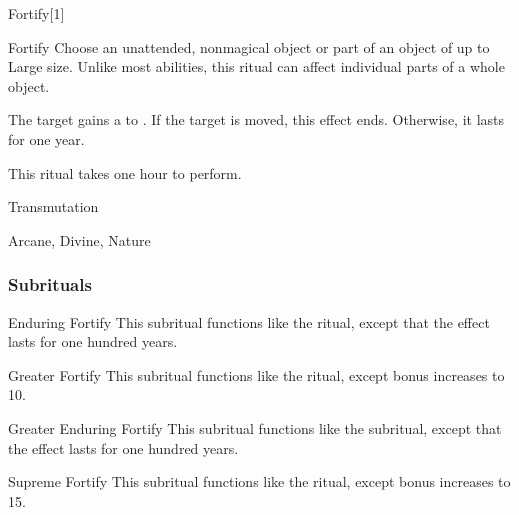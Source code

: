 \begin{spellsection}{Fortify}[1]

\begin{spellheader}
\end{spellheader}


\begin{ability}{Fortify}
Choose an unattended, nonmagical object or part of an object of up to Large size.
Unlike most abilities, this ritual can affect individual parts of a whole object.

The target gains a   to .
If the target is moved, this effect ends.
Otherwise, it lasts for one year.

This ritual takes one hour to perform.
\end{ability}




 Transmutation

 Arcane, Divine, Nature
\end{spellsection}


\subsubsection{Subrituals}


\begin{ability}[\nth{3}]{Enduring Fortify}
This subritual functions like the  ritual, except that the effect lasts for one hundred years.
\end{ability}
\vspace{0.25em}


\begin{ability}[\nth{3}]{Greater Fortify}
This subritual functions like the  ritual, except  bonus increases to 10.
\end{ability}
\vspace{0.25em}


\begin{ability}[\nth{5}]{Greater Enduring Fortify}
This subritual functions like the  subritual, except that the effect lasts for one hundred years.
\end{ability}
\vspace{0.25em}


\begin{ability}[\nth{6}]{Supreme Fortify}
This subritual functions like the  ritual, except  bonus increases to 15.
\end{ability}
\vspace{0.25em}


